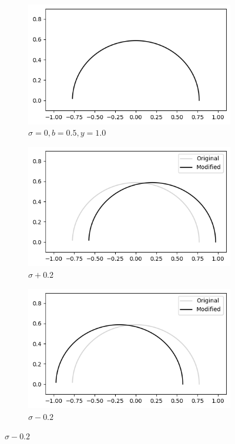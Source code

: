 \documentclass[a4paper]{report}
\begin{document}
\begin{figure}[H]
    \begin{subfigure}{.3\linewidth}
      \includegraphics[width=\linewidth]{images/deformations/base.png}
      \caption{$\sigma = 0, b = 0.5, y = 1.0$}
      \label{fig:base_deform}
    \end{subfigure}\hfill
    \begin{subfigure}{.3\linewidth}
      \includegraphics[width=\linewidth]{images/deformations/positive_sigma.png}
      \caption{$\sigma + 0.2$}
      \label{fig:positive_sigma}
    \end{subfigure}\hfill
    \begin{subfigure}{.3\linewidth}
      \includegraphics[width=\linewidth]{images/deformations/negative_sigma.png}
      \caption{$\sigma - 0.2$}
        \label{fig:negative_sigma}
    \end{subfigure}


\end{figure}
\end{document}
